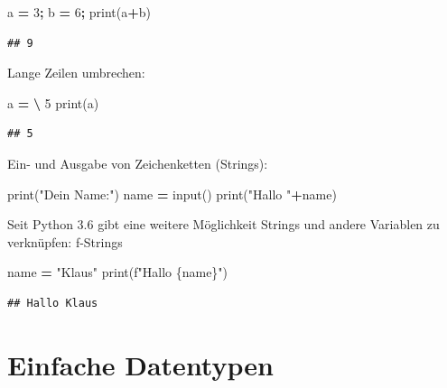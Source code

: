\documentclass[
]{book}
\newenvironment{Shaded}{\begin{snugshade}}{\end{snugshade}}
\newcommand{\BuiltInTok}[1]{#1}
\newcommand{\DecValTok}[1]{\textcolor[rgb]{0.00,0.00,0.81}{#1}}
\newcommand{\NormalTok}[1]{#1}
\newcommand{\OperatorTok}[1]{\textcolor[rgb]{0.81,0.36,0.00}{\textbf{#1}}}
\newcommand{\SpecialCharTok}[1]{\textcolor[rgb]{0.00,0.00,0.00}{#1}}
\newcommand{\SpecialStringTok}[1]{\textcolor[rgb]{0.31,0.60,0.02}{#1}}
\newcommand{\StringTok}[1]{\textcolor[rgb]{0.31,0.60,0.02}{#1}}
\begin{document}
\begin{Shaded}
\begin{Highlighting}[]
\NormalTok{a }\OperatorTok{=} \DecValTok{3}\OperatorTok{;}\NormalTok{ b }\OperatorTok{=} \DecValTok{6}\OperatorTok{;}
\BuiltInTok{print}\NormalTok{(a}\OperatorTok{+}\NormalTok{b)}
\end{Highlighting}
\end{Shaded}

\begin{verbatim}
## 9
\end{verbatim}

Lange Zeilen umbrechen:

\begin{Shaded}
\begin{Highlighting}[]
\NormalTok{a }\OperatorTok{=} \OperatorTok{\textbackslash{}}
\DecValTok{5}
\BuiltInTok{print}\NormalTok{(a)}
\end{Highlighting}
\end{Shaded}

\begin{verbatim}
## 5
\end{verbatim}

Ein- und Ausgabe von Zeichenketten (Strings):

\begin{Shaded}
\begin{Highlighting}[]
\BuiltInTok{print}\NormalTok{(}\StringTok{"Dein Name:"}\NormalTok{)}
\NormalTok{name }\OperatorTok{=} \BuiltInTok{input}\NormalTok{()}
\BuiltInTok{print}\NormalTok{(}\StringTok{"Hallo "}\OperatorTok{+}\NormalTok{name)}
\end{Highlighting}
\end{Shaded}

Seit Python 3.6 gibt eine weitere Möglichkeit Strings und andere Variablen zu verknüpfen: f-Strings

\begin{Shaded}
\begin{Highlighting}[]
\NormalTok{name }\OperatorTok{=} \StringTok{"Klaus"}
\BuiltInTok{print}\NormalTok{(}\SpecialStringTok{f"Hallo }\SpecialCharTok{\{}\NormalTok{name}\SpecialCharTok{\}}\SpecialStringTok{"}\NormalTok{)}
\end{Highlighting}
\end{Shaded}

\begin{verbatim}
## Hallo Klaus
\end{verbatim}

\hypertarget{einfache-datentypen}{%
\section{Einfache Datentypen}\label{einfache-datentypen}}
\end{document}
